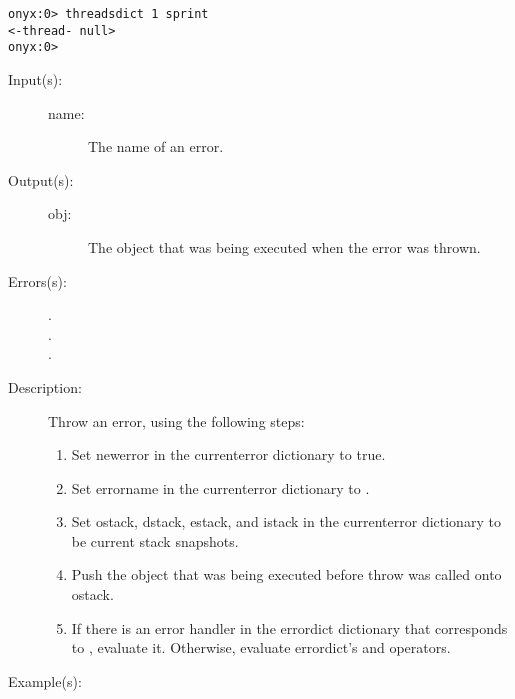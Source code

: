 \begin{description}
\begin{description}
\begin{verbatim}
onyx:0> threadsdict 1 sprint
<-thread- null>
onyx:0>
		\end{verbatim}
	\end{description}
\label{systemdict:throw}
\item[{\onyxop{name}{throw}{obj}}: ]
	\begin{description}\item[]
	\item[Input(s): ]
		\begin{description}\item[]
		\item[name: ] The name of an error.
		\end{description}
	\item[Output(s): ]
		\begin{description}\item[]
		\item[obj: ]
			The object that was being executed when the error was
			thrown.
		\end{description}
	\item[Errors(s): ]
		\begin{description}\item[]
		\item[.]
		\item[.]
		\item[.]
		\end{description}
	\item[Description: ]
		Throw an error, using the following steps:
		\begin{enumerate}
		\item{Set newerror in the currenterror dictionary to true.}
		\item{Set errorname in the currenterror dictionary to
		.}
		\item{Set ostack, dstack, estack, and istack in the currenterror
		dictionary to be current stack snapshots.}
		\item{Push the object that was being executed before throw was
		called onto ostack.}
		\item{If there is an error handler in the errordict dictionary
		that corresponds to , evaluate it.  Otherwise,
		evaluate errordict's
		 and
		 operators.}
		\end{enumerate}
	\item[Example(s): ]\begin{verbatim}


\end{verbatim}
\end{description}
\end{description}
